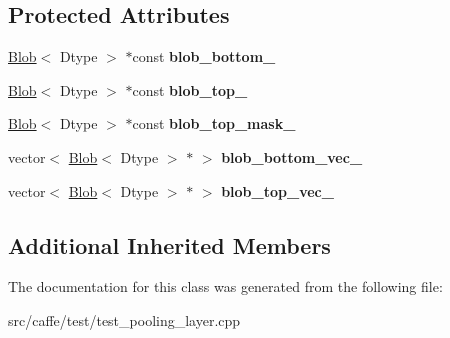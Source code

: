 \subsection*{Protected Attributes}
\begin{DoxyCompactItemize}
\item 
\mbox{\label{classcaffe_1_1_pooling_layer_test_a585db55ec06fd23c68d870427a579b01}} 
\mbox{\hyperlink{classcaffe_1_1_blob}{Blob}}$<$ Dtype $>$ $\ast$const {\bfseries blob\+\_\+bottom\+\_\+}
\item 
\mbox{\label{classcaffe_1_1_pooling_layer_test_a753d14878f23a15c7a8acec9783298e7}} 
\mbox{\hyperlink{classcaffe_1_1_blob}{Blob}}$<$ Dtype $>$ $\ast$const {\bfseries blob\+\_\+top\+\_\+}
\item 
\mbox{\label{classcaffe_1_1_pooling_layer_test_a67c6c83a9e107d913f59f974e45ad842}} 
\mbox{\hyperlink{classcaffe_1_1_blob}{Blob}}$<$ Dtype $>$ $\ast$const {\bfseries blob\+\_\+top\+\_\+mask\+\_\+}
\item 
\mbox{\label{classcaffe_1_1_pooling_layer_test_a0325e0cb131b6c5e51b91aded2fc2989}} 
vector$<$ \mbox{\hyperlink{classcaffe_1_1_blob}{Blob}}$<$ Dtype $>$ $\ast$ $>$ {\bfseries blob\+\_\+bottom\+\_\+vec\+\_\+}
\item 
\mbox{\label{classcaffe_1_1_pooling_layer_test_a56781cb49d902bf5ba18fe4f91c46cdc}} 
vector$<$ \mbox{\hyperlink{classcaffe_1_1_blob}{Blob}}$<$ Dtype $>$ $\ast$ $>$ {\bfseries blob\+\_\+top\+\_\+vec\+\_\+}
\end{DoxyCompactItemize}
\subsection*{Additional Inherited Members}


The documentation for this class was generated from the following file\+:\begin{DoxyCompactItemize}
\item 
src/caffe/test/test\+\_\+pooling\+\_\+layer.\+cpp\end{DoxyCompactItemize}
